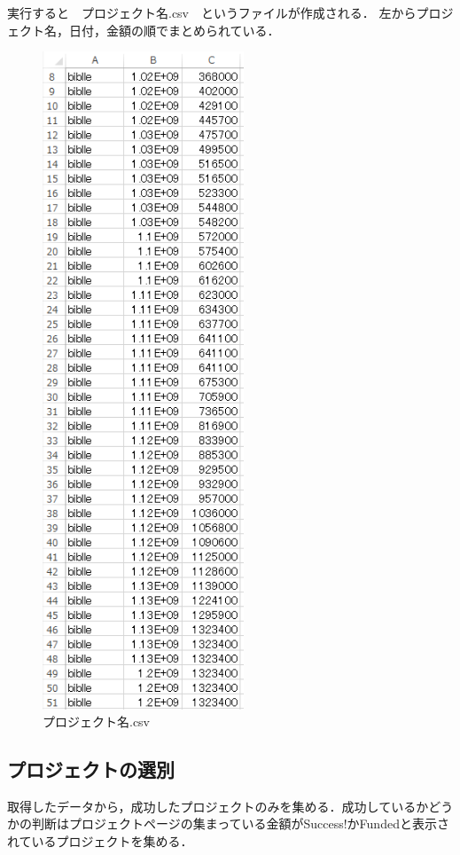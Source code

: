 実行すると　プロジェクト名.csv　というファイルが作成される．
左からプロジェクト名，日付，金額の順でまとめられている．

\newpage
\begin{figure}[H]
\centering
\includegraphics[width=6cm]{P2.PNG}
\caption{プロジェクト名.csv}\label{サンプル図}
\end{figure}

\newpage
\subsection{プロジェクトの選別}
取得したデータから，成功したプロジェクトのみを集める．成功しているかどうかの判断はプロジェクトページの集まっている金額がSuccess!かFundedと表示されているプロジェクトを集める．

